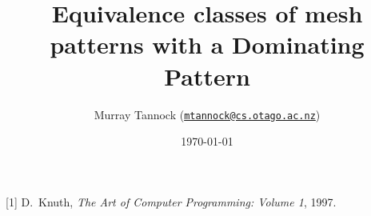 \documentclass[11pt, aspectratio=169]{beamer}
\title[Dominating Patterns]{Equivalence classes of mesh patterns with a Dominating Pattern}
\author[M.~Tannock]{Murray Tannock (\href{mailto:mtannock@cs.otago.ac.nz}{\texttt{mtannock@cs.otago.ac.nz}})}
\institute[University of Otago]
{
\texttt{[image: ou-logo]}
}
\date{\today}
\begin{document}
  \begin{frame}
    \titlepage
  \end{frame}



%
%
\begin{thebibliography}{10}
  [1]
    D.~Knuth,
    \newblock
    \newblock \emph{The Art of Computer Programming: Volume 1}, 1997.
  \end{thebibliography}
\end{document}
